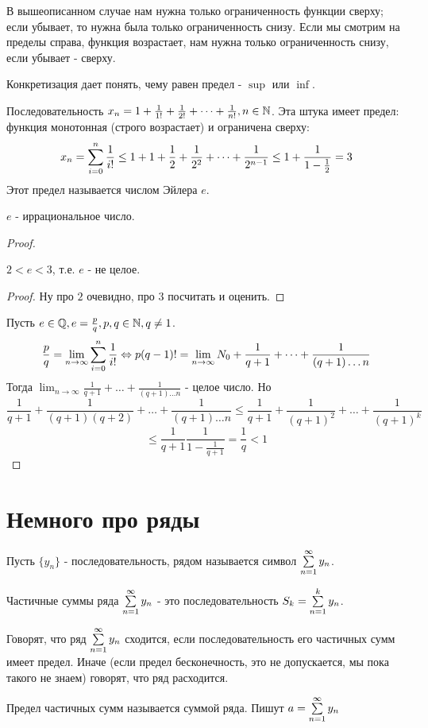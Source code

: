 \documentclass[12pt]{report}
\begin{document}
\begin{rem}
В вышеописанном случае нам нужна только ограниченность функции сверху; если убывает, то нужна была только ограниченность снизу. Если мы смотрим на пределы справа, функция возрастает, нам нужна только ограниченность снизу, если убывает - сверху.

Конкретизация дает понять, чему равен предел - $\sup$ или $\inf$.
\end{rem}

\begin{ex}
Последовательность $x_n = 1 + \frac{1}{1!} + \frac{1}{2!} + \dots + \frac{1}{n!}, n \in \mathbb{N}$. Эта штука имеет предел: функция монотонная (строго возрастает) и ограничена сверху: 
$$x_n = \sum\limits_{i = 0}^n{\frac{1}{i!}} \le 1 + 1 + \frac{1}{2} + \frac{1}{2^2} + \dots + \frac{1}{2^{n - 1}} \le 1 + \frac{1}{1 - \frac{1}{2}} = 3$$
Этот предел называется числом Эйлера $e$.
\end{ex}

\begin{thm}
$e$ - иррациональное число.
\end{thm}
\begin{proof}
\begin{lm}
$2 < e < 3$, т.е. $e$ - не целое.
\end{lm}

\begin{proof}
Ну про $2$ очевидно, про $3$ посчитать и оценить.
\end{proof}

Пусть $e \in \mathbb{Q}, e = \frac{p}{q}, p, q \in \mathbb{N}, q \neq 1$. 
$$\frac{p}{q} = \lim_{n \to \infty}{\sum\limits_{i = 0}^n{\frac{1}{i!}}} \Leftrightarrow p (q - 1)! = \lim_{n \to \infty}{N_0 + \frac{1}{q + 1} + \dots + \frac{1}{(q + 1) \dots n}}$$
Тогда $\lim_{n \to \infty}{\frac{1}{q + 1} + \dots + \frac{1}{(q + 1)\dots n}}$ - целое число. Но
$$\frac{1}{q + 1} + \frac{1}{(q + 1)(q + 2)} + \dots + \frac{1}{(q + 1)\dots n} \le \frac{1}{q + 1} + \frac{1}{(q + 1)^2} + \dots + \frac{1}{(q + 1)^k} $$
$$ \le \frac{1}{q + 1}\frac{1}{1 - \frac{1}{q + 1}} = \frac{1}{q} < 1$$
\end{proof}

\section{Немного про ряды}

\begin{defn}
Пусть $\{y_n\}$ - последовательность, рядом называется символ $\sum\limits_{n = 1}^\infty{y_n}$.

Частичные суммы ряда $\sum\limits_{n = 1}^\infty{y_n}$  - это последовательность $S_k = \sum\limits_{n = 1}^k{y_n}$.

Говорят, что ряд $\sum\limits_{n = 1}^\infty{y_n}$ сходится, если последовательность его частичных сумм имеет предел. Иначе (если предел бесконечность, это не допускается, мы пока такого не знаем) говорят, что ряд расходится.

Предел частичных сумм называется суммой ряда. Пишут $a  = \sum\limits_{n = 1}^\infty{y_n}$
\end{defn}
\end{document}
